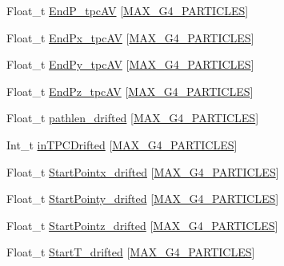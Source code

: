 \begin{DoxyCompactItemize}
Float\-\_\-t \hyperlink{classanatree_afc7c1fefd00749006c2bb4f3d1b58b5f}{End\-P\-\_\-tpc\-A\-V} \mbox{[}\hyperlink{anatree__core__v09410002_8h_aa5cbba5cc53c011e88805f38503de894}{M\-A\-X\-\_\-\-G4\-\_\-\-P\-A\-R\-T\-I\-C\-L\-E\-S}\mbox{]}
\item 
Float\-\_\-t \hyperlink{classanatree_a8118bff57ec868b5c21473ff56e91fe8}{End\-Px\-\_\-tpc\-A\-V} \mbox{[}\hyperlink{anatree__core__v09410002_8h_aa5cbba5cc53c011e88805f38503de894}{M\-A\-X\-\_\-\-G4\-\_\-\-P\-A\-R\-T\-I\-C\-L\-E\-S}\mbox{]}
\item 
Float\-\_\-t \hyperlink{classanatree_ae56bc5885df964287d74596ca6e4aaf8}{End\-Py\-\_\-tpc\-A\-V} \mbox{[}\hyperlink{anatree__core__v09410002_8h_aa5cbba5cc53c011e88805f38503de894}{M\-A\-X\-\_\-\-G4\-\_\-\-P\-A\-R\-T\-I\-C\-L\-E\-S}\mbox{]}
\item 
Float\-\_\-t \hyperlink{classanatree_a9fb4a6d5e46a409129e5f53dbaee5e55}{End\-Pz\-\_\-tpc\-A\-V} \mbox{[}\hyperlink{anatree__core__v09410002_8h_aa5cbba5cc53c011e88805f38503de894}{M\-A\-X\-\_\-\-G4\-\_\-\-P\-A\-R\-T\-I\-C\-L\-E\-S}\mbox{]}
\item 
Float\-\_\-t \hyperlink{classanatree_a10be797dd4bcb299896e159ba44755b6}{pathlen\-\_\-drifted} \mbox{[}\hyperlink{anatree__core__v09410002_8h_aa5cbba5cc53c011e88805f38503de894}{M\-A\-X\-\_\-\-G4\-\_\-\-P\-A\-R\-T\-I\-C\-L\-E\-S}\mbox{]}
\item 
Int\-\_\-t \hyperlink{classanatree_af0d8948732aa5f642cdb5e376d432b2e}{in\-T\-P\-C\-Drifted} \mbox{[}\hyperlink{anatree__core__v09410002_8h_aa5cbba5cc53c011e88805f38503de894}{M\-A\-X\-\_\-\-G4\-\_\-\-P\-A\-R\-T\-I\-C\-L\-E\-S}\mbox{]}
\item 
Float\-\_\-t \hyperlink{classanatree_a9e41c51e5868649eb19b24de07640f9d}{Start\-Pointx\-\_\-drifted} \mbox{[}\hyperlink{anatree__core__v09410002_8h_aa5cbba5cc53c011e88805f38503de894}{M\-A\-X\-\_\-\-G4\-\_\-\-P\-A\-R\-T\-I\-C\-L\-E\-S}\mbox{]}
\item 
Float\-\_\-t \hyperlink{classanatree_a79ef86416f1ee4bacad0b4e007311d27}{Start\-Pointy\-\_\-drifted} \mbox{[}\hyperlink{anatree__core__v09410002_8h_aa5cbba5cc53c011e88805f38503de894}{M\-A\-X\-\_\-\-G4\-\_\-\-P\-A\-R\-T\-I\-C\-L\-E\-S}\mbox{]}
\item 
Float\-\_\-t \hyperlink{classanatree_a6a10be4f89bfbfff86e9f5d61d58725d}{Start\-Pointz\-\_\-drifted} \mbox{[}\hyperlink{anatree__core__v09410002_8h_aa5cbba5cc53c011e88805f38503de894}{M\-A\-X\-\_\-\-G4\-\_\-\-P\-A\-R\-T\-I\-C\-L\-E\-S}\mbox{]}
\item 
Float\-\_\-t \hyperlink{classanatree_ad61483d1a304b519dd3c5a0ddd601939}{Start\-T\-\_\-drifted} \mbox{[}\hyperlink{anatree__core__v09410002_8h_aa5cbba5cc53c011e88805f38503de894}{M\-A\-X\-\_\-\-G4\-\_\-\-P\-A\-R\-T\-I\-C\-L\-E\-S}\mbox{]}

\end{DoxyCompactItemize}
